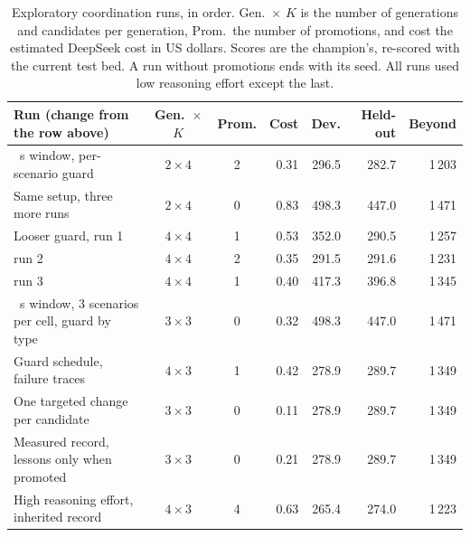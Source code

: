 \begin{table}[tb]
  \centering
  \caption{Exploratory coordination runs, in order. Gen.\ $\times$ $K$ is the
    number of generations and candidates per generation, Prom.\ the number of
    promotions, and cost the estimated DeepSeek cost in US dollars. Scores
    are the champion's, re-scored with the current test bed. A run without
    promotions ends with its seed. All runs used low reasoning effort except
    the last.}
  \label{tab:coord-runs}
  \small\setlength{\tabcolsep}{4pt}
  \begin{tabular}{@{}>{\raggedright\arraybackslash}p{}ccrrrr@{}}
    \toprule
    Run (change from the row above) & Gen.\ $\times$ $K$ & Prom. & Cost
      & Dev. & Held-out & Beyond \\
    \midrule
    50~s window, per-scenario guard            & $2 \times 4$ & 2 & 0.31 & 296.5 & 282.7 & 1\,203 \\
    Same setup, three more runs                & $2 \times 4$ & 0 & 0.83 & 498.3 & 447.0 & 1\,471 \\
    Looser guard, run 1                        & $4 \times 4$ & 1 & 0.53 & 352.0 & 290.5 & 1\,257 \\
    \phantom{Looser guard,} run 2              & $4 \times 4$ & 2 & 0.35 & 291.5 & 291.6 & 1\,231 \\
    \phantom{Looser guard,} run 3              & $4 \times 4$ & 1 & 0.40 & 417.3 & 396.8 & 1\,345 \\
    600~s window, 3 scenarios per cell, guard by type
                                               & $3 \times 3$ & 0 & 0.32 & 498.3 & 447.0 & 1\,471 \\
    Guard schedule, failure traces             & $4 \times 3$ & 1 & 0.42 & 278.9 & 289.7 & 1\,349 \\
    One targeted change per candidate          & $3 \times 3$ & 0 & 0.11 & 278.9 & 289.7 & 1\,349 \\
    Measured record, lessons only when promoted & $3 \times 3$ & 0 & 0.21 & 278.9 & 289.7 & 1\,349 \\
    High reasoning effort, inherited record    & $4 \times 3$ & 4 & 0.63 & 265.4 & 274.0 & 1\,223 \\
    \bottomrule
  \end{tabular}
\end{table}

